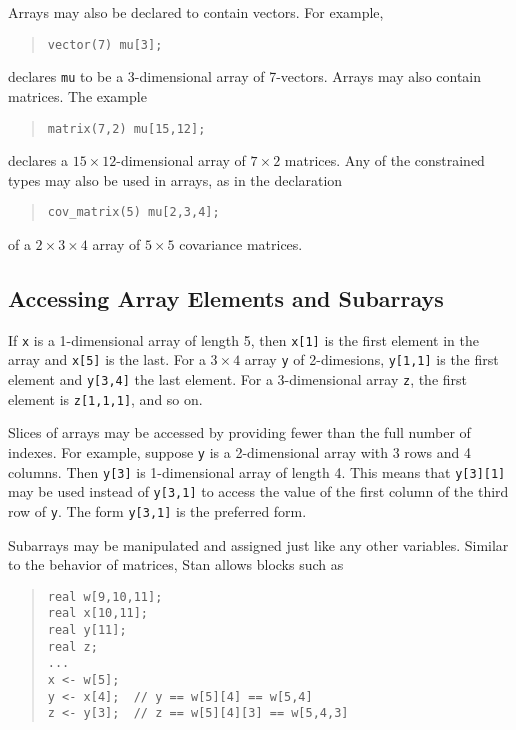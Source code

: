 \documentclass[10pt]{report}
\newcommand{\Stan}{Stan\xspace}
\newcommand{\code}[1]{{\tt #1}}
\begin{document}
Arrays may also be declared to contain vectors.  For example,
%
\begin{quote}
\begin{Verbatim}  
vector(7) mu[3];
\end{Verbatim}
\end{quote}
% 
declares \code{mu} to be a 3-dimensional array of 7-vectors.  
Arrays may also contain matrices.  The example
%
\begin{quote}
\begin{Verbatim} 
matrix(7,2) mu[15,12];
\end{Verbatim}
\end{quote}
%
declares a $15 \times 12$-dimensional array of $7 \times 2$ matrices.
Any of the constrained types may also be used in arrays, as in the
declaration
%
\begin{quote}
\begin{Verbatim}  
cov_matrix(5) mu[2,3,4];
\end{Verbatim}
\end{quote}
% 
of a $2 \times 3 \times 4$ array of $5 \times 5$ covariance matrices.

\subsection{Accessing Array Elements and Subarrays}

If \code{x} is a 1-dimensional array of length 5, then \code{x[1]} is
the first element in the array and \code{x[5]} is the last.  For a $3
\times 4$ array \code{y} of 2-dimesions, \code{y[1,1]} is the first
element and \code{y[3,4]} the last element.  For a 3-dimensional
array \code{z}, the first element is \code{z[1,1,1]}, and so on.

Slices of arrays may be accessed by providing fewer than the full
number of indexes.  For example, suppose \code{y} is a 2-dimensional
array with 3 rows and 4 columns.  Then \code{y[3]} is 1-dimensional
array of length 4.  This means that \code{y[3][1]} may be used instead
of \code{y[3,1]} to access the value of the first column of the third
row of \code{y}.  The form \code{y[3,1]} is the preferred form.

Subarrays may be manipulated and assigned just like any other
variables.  Similar to the behavior of matrices, \Stan allows blocks
such as 
%
\begin{quote}
\begin{Verbatim} 
real w[9,10,11];
real x[10,11];
real y[11];
real z;
...
x <- w[5];
y <- x[4];  // y == w[5][4] == w[5,4]
z <- y[3];  // z == w[5][4][3] == w[5,4,3]
\end{Verbatim}
\end{quote}
%
\end{document}
